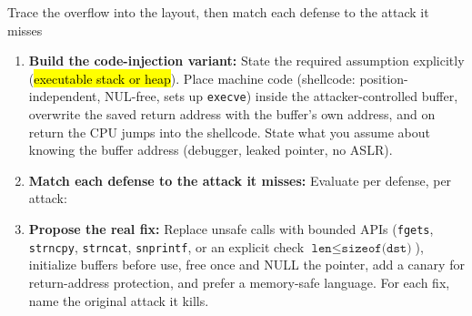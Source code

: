 \documentclass[12pt, a4paper]{article}
\newcommand{\imp}[1]{\hl{#1}}                       %
\begin{document}
\begin{schemebox}{Trace the overflow into the layout, then match each defense to the attack it misses}
\begin{enumerate}[label=\textbf{Step \arabic*:}, leftmargin=*]
    \item \textbf{Build the code-injection variant:} State the required assumption explicitly (\imp{executable stack or heap}). Place machine code (shellcode: position-independent, NUL-free, sets up \texttt{execve}) inside the attacker-controlled buffer, overwrite the saved return address with the buffer's own address, and on return the CPU jumps into the shellcode. State what you assume about knowing the buffer address (debugger, leaked pointer, no ASLR).
    \item \textbf{Match each defense to the attack it misses:} Evaluate per defense, per attack: 
    \item \textbf{Propose the real fix:} Replace unsafe calls with bounded APIs (\texttt{fgets}, \texttt{strncpy}, \texttt{strncat}, \texttt{snprintf}, or an explicit check $\texttt{len} \leq \texttt{sizeof(dst)}$), initialize buffers before use, free once and NULL the pointer, add a canary for return-address protection, and prefer a memory-safe language. For each fix, name the original attack it kills.
\end{enumerate}
\end{schemebox}
\end{document}

